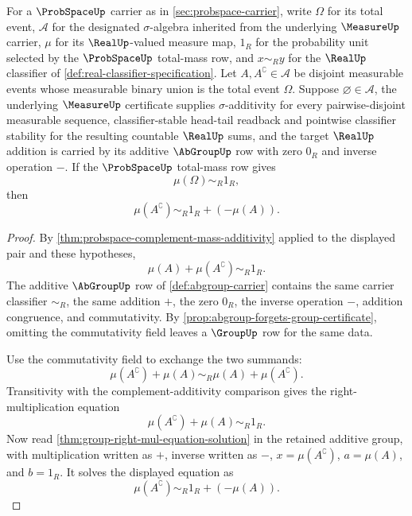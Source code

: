 \begin{theorem}
\label{thm:probspace-complement-mass-one-minus}
For a $\ProbSpaceUp$ carrier as in \autoref{sec:probspace-carrier}, write $\Omega$ for its total event, $\mathcal{A}$ for the designated $\sigma$-algebra inherited from the underlying $\MeasureUp$ carrier, $\mu$ for its $\RealUp$-valued measure map, $1_R$ for the probability unit selected by the $\ProbSpaceUp$ total-mass row, and $x\sim_R y$ for the $\RealUp$ classifier of \autoref{def:real-classifier-specification}. Let $A,A^\complement\in\mathcal{A}$ be disjoint measurable events whose measurable binary union is the total event $\Omega$. Suppose $\varnothing\in\mathcal{A}$, the underlying $\MeasureUp$ certificate supplies $\sigma$-additivity for every pairwise-disjoint measurable sequence, classifier-stable head-tail readback and pointwise classifier stability for the resulting countable $\RealUp$ sums, and the target $\RealUp$ addition is carried by its additive $\AbGroupUp$ row with zero $0_R$ and inverse operation $-$. If the $\ProbSpaceUp$ total-mass row gives
$$
\mu(\Omega)\sim_R1_R,
$$
then
$$
\mu(A^\complement)\sim_R1_R+(-\mu(A)).
$$
\end{theorem}
\begin{proof}
By \autoref{thm:probspace-complement-mass-additivity} applied to the displayed pair and these hypotheses,
$$
\mu(A)+\mu(A^\complement)\sim_R1_R.
$$
The additive $\AbGroupUp$ row of \autoref{def:abgroup-carrier} contains the same carrier classifier $\sim_R$, the same addition $+$, the zero $0_R$, the inverse operation $-$, addition congruence, and commutativity. By \autoref{prop:abgroup-forgets-group-certificate}, omitting the commutativity field leaves a $\GroupUp$ row for the same data.

Use the commutativity field to exchange the two summands:
$$
\mu(A^\complement)+\mu(A)\sim_R\mu(A)+\mu(A^\complement).
$$
Transitivity with the complement-additivity comparison gives the right-multiplication equation
$$
\mu(A^\complement)+\mu(A)\sim_R1_R.
$$
Now read \autoref{thm:group-right-mul-equation-solution} in the retained additive group, with multiplication written as $+$, inverse written as $-$, $x=\mu(A^\complement)$, $a=\mu(A)$, and $b=1_R$. It solves the displayed equation as
$$
\mu(A^\complement)\sim_R1_R+(-\mu(A)).
$$
\end{proof}

